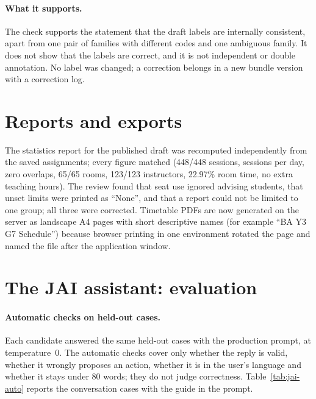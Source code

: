 \paragraph{What it supports.} The check supports the statement that the draft labels are internally consistent, apart from one pair of families with different codes and one ambiguous family. It does not show that the labels are correct, and it is not independent or double annotation. No label was changed; a correction belongs in a new bundle version with a correction log.

\section{Reports and exports}
The statistics report for the published draft was recomputed independently from the saved assignments; every figure matched (448/448 sessions, sessions per day, zero overlaps, 65/65 rooms, 123/123 instructors, 22.97\% room time, no extra teaching hours). The review found that seat use ignored advising students, that unset limits were printed as ``None'', and that a report could not be limited to one group; all three were corrected. Timetable PDFs are now generated on the server as landscape A4 pages with short descriptive names (for example ``BA Y3 G7 Schedule'') because browser printing in one environment rotated the page and named the file after the application window.


\section{The JAI assistant: evaluation}\label{evidence-jai-results}

\paragraph{Automatic checks on held-out cases.} Each candidate answered the same held-out cases with the production prompt, at temperature~0. The automatic checks cover only whether the reply is valid, whether it wrongly proposes an action, whether it is in the user's language and whether it stays under 80 words; they do not judge correctness. Table~\ref{tab:jai-auto} reports the conversation cases with the guide in the prompt.

